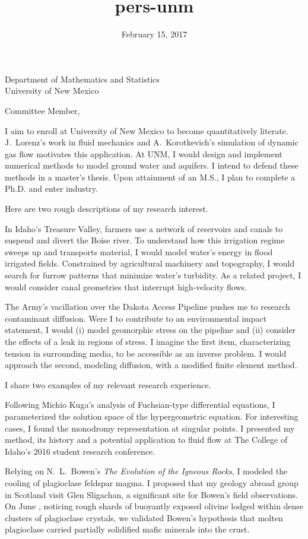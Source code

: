 \documentclass[10pt]{letter}
\date{February 15, 2017}
\title{pers-unm}
\newcommand{\topic}[1]{\textmd{#1}}
\begin{document}
\begin{letter}{
Department of Mathematics and Statistics\\
University of New Mexico
}
\opening{Committee Member,}
I aim to enroll at University of New Mexico to become quantitatively literate. J.~Lorenz's work in fluid mechanics and A.~Korotkevich's simulation of dynamic gas flow motivates this application. At UNM, I would design and implement numerical methods to model ground water and aquifers. I intend to defend these methods in a master's thesis. Upon attainment of an M.S., I plan to complete a Ph.D. and enter industry.

Here are two rough descriptions of my research interest. 
\begin{description}[topsep=0pt]
	\item[Sediment Transport]
		In Idaho's Treasure Valley, farmers use a network of reservoirs and canals to suspend and divert the Boise river. To understand how this irrigation regime sweeps up and transports material, I would model water's energy in flood irrigated fields. Constrained by agricultural machinery and topography, I would search for furrow patterns that minimize water's turbidity. As a related project, I would consider canal geometries that interrupt high-velocity flows.
	\item[Ground Water Contamination]
		The Army's vacillation over the Dakota Access Pipeline pushes me to research contaminant diffusion. Were I to contribute to an environmental impact statement, I would (i) model geomorphic stress on the pipeline and (ii) consider the effects of a leak in regions of stress. I imagine the first item, characterizing tension in surrounding media, to be accessible as an inverse problem. I would approach the second, modeling diffusion, with a modified finite element method.
\end{description}

I share two examples of my relevant research experience. 
\begin{description}[topsep=0pt]
    \item[Galois Theory \& Fuchsian Equations] 
    	Following Michio Kuga's analysis of Fuchsian-type differential equations, I parameterized the solution space of the hypergeometric equation. For interesting cases, I found the monodromy representation at singular points. I presented my method, its history and a potential application to \topic{fluid flow} at The College of Idaho's 2016 student research conference.
    \item[Igneous Dikes in Scotland]
        Relying on N.~L.~Bowen's \emph{The Evolution of the Igneous Rocks}, I modeled the cooling of plagioclase feldspar magma. I proposed that my geology abroad group in Scotland visit Glen Sligachan, a significant site for Bowen's field observations. On June , noticing rough shards of buoyantly exposed olivine lodged within dense clusters of plagioclase crystals, we validated Bowen's hypothesis that molten plagioclase carried partially solidified mafic minerals into the crust. 
\end{description}


\end{letter}
\end{document}
